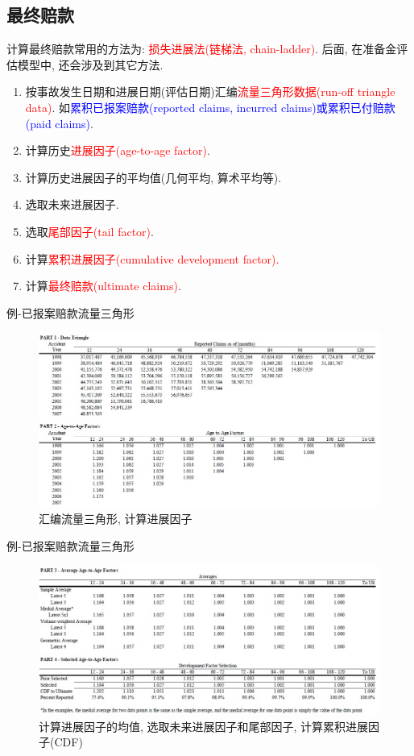 \documentclass[professionalfont]{beamer}
\newcommand{\red}[1]{\textcolor{red}{#1}}
\newcommand{\blue}[1]{\textcolor{blue}{#1}}
\begin{document}
\subsection{最终赔款}
\begin{frame}
	计算最终赔款常用的方法为: \red{损失进展法(链梯法, chain-ladder)}. 后面, 在准备金评估模型中, 还会涉及到其它方法.
	\begin{enumerate}
		\item 按事故发生日期和进展日期(评估日期)汇编\red{流量三角形数据(run-off triangle data)}. 如\blue{累积已报案赔款(reported claims, incurred claims)或累积已付赔款(paid claims)}.
		\item 计算历史\red{进展因子(age-to-age factor)}.
		\item 计算历史进展因子的平均值(几何平均, 算术平均等).
		\item 选取未来进展因子.
		\item 选取\red{尾部因子(tail factor)}.
		\item 计算\red{累积进展因子(cumulative development factor).}
		\item 计算\red{最终赔款(ultimate claims)}.
	\end{enumerate}
\end{frame}
\begin{frame}{例-已报案赔款流量三角形}
	\begin{figure}
		\includegraphics[width=1\textwidth]{Plots/CL1.jpg}
		\caption{汇编流量三角形, 计算进展因子}
	\end{figure}
\end{frame}
\begin{frame}{例-已报案赔款流量三角形}
	\begin{figure}
		\includegraphics[width=1\textwidth]{Plots/CL2.jpg}
		\caption{计算进展因子的均值, 选取未来进展因子和尾部因子, 计算累积进展因子(CDF)}
	\end{figure}
\end{frame}
\end{document}
